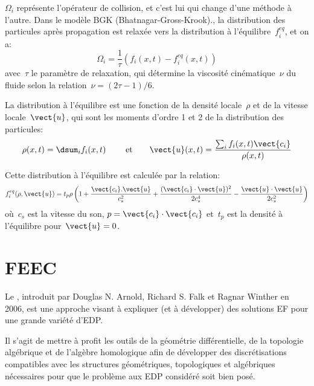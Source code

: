 $\Omega_i$ représente l'opérateur de collision, et c'est lui qui change d'une méthode à l'autre.
Dans le modèle BGK (Bhatnagar-Gross-Krook).,
la distribution des particules après propagation est relaxée vers la distribution à l'équilibre~$f_i^{eq}$,
et on a:
\begin{equation} \Omega_i = \frac1{\tau}\left(f_i(x,t)-f_i^{eq}(x,t)\right) \end{equation}
avec~$\tau$ le paramètre de relaxation, qui détermine la viscosité cinématique~$\nu$ du
fluide selon la relation~$\nu=(2\tau -1)/6$.

La distribution à l'équilibre est une fonction de la densité locale~$\rho$ et de la vitesse locale~$\vect{u}$,
qui sont les moments d'ordre 1 et 2 de la distribution des particules:
\begin{equation} \rho(x,t) = \dsum_i f_i(x,t) \qquad\text{ et}\qquad \vect{u}(x,t)=\dfrac{\sum_i f_i(x,t)\vect{c_i}}{\rho(x,t)} \end{equation}

Cette distribution à l'équilibre est calculée par la relation:
\begin{equation} f_i^{eq}(\rho,\vect{u}) = t_p \rho \left(1+\dfrac{\vect{c_i}.\vect{u}}{c_s^2} + 
\dfrac{(\vect{c_i}\cdot\vect{u})^2}{2c_s^4} - \dfrac{\vect{u}\cdot\vect{u}}{2c_s^2}\right) \end{equation}
où~$c_s$ est la vitesse du son, $p=\vect{c_i}\cdot\vect{c_i}$ et~$t_p$ est la densité à l'équilibre
pour~$\vect{u}=0$.






\medskip{}
\section{FEEC}

Le , introduit par Douglas N. Arnold, 
Richard S. Falk et Ragnar Winther 
en 2006, est une approche visant à expliquer (et à développer) 
des solutions EF pour une grande variété d'EDP.

Il s'agit de mettre à profit les outils de la géométrie différentielle, de la topologie 
algébrique et de l'algèbre homologique afin de développer des discrétisations compatibles 
avec les structures géométriques, topologiques et algébriques nécessaires pour que le
problème aux EDP considéré soit bien posé.

